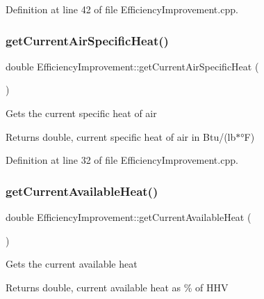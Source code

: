 Definition at line 42 of file Efficiency\+Improvement.\+cpp.

\mbox{\label{class_efficiency_improvement_a0d8b0d8968802a7994784380be376dfb}} 
\subsubsection{\texorpdfstring{get\+Current\+Air\+Specific\+Heat()}{getCurrentAirSpecificHeat()}}
{\footnotesize\ttfamily double Efficiency\+Improvement\+::get\+Current\+Air\+Specific\+Heat (\begin{DoxyParamCaption}{ }\end{DoxyParamCaption})}

Gets the current specific heat of air

\begin{DoxyReturn}{Returns}
double, current specific heat of air in Btu/(lb$\ast$°F) 
\end{DoxyReturn}


Definition at line 32 of file Efficiency\+Improvement.\+cpp.

\mbox{\label{class_efficiency_improvement_a4f1ef470ee88c9d3ac05be0bd5755157}} 
\subsubsection{\texorpdfstring{get\+Current\+Available\+Heat()}{getCurrentAvailableHeat()}}
{\footnotesize\ttfamily double Efficiency\+Improvement\+::get\+Current\+Available\+Heat (\begin{DoxyParamCaption}{ }\end{DoxyParamCaption})}

Gets the current available heat

\begin{DoxyReturn}{Returns}
double, current available heat as \% of H\+HV 
\end{DoxyReturn}


